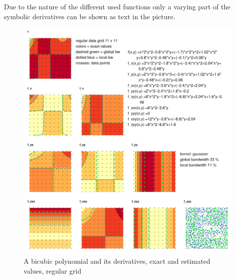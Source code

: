 \documentclass[nojss]{jss}
\begin{document}
Due to the nature of the different used functions only a varying part of 
the symbolic derivatives can be shown as text in the picture.


\begin{figure}[htb]
\centering
\includegraphics{fig--024}
\caption{A bicubic polynomial and its derivatives, exact and estimated values, regular grid}
\label{fig:poly}
\end{figure}
\end{document}
